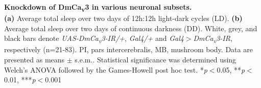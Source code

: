 \label{fig:S5}
\textbf{Knockdown of DmCa\textsubscript{v}3 in various neuronal subsets.}
\\
\textbf {(a)} Average total sleep over two days of 12h:12h light-dark cycles (LD).
\textbf {(b)} Average total sleep over two days of continuous darkness (DD).
White, grey, and black bars denote \emph{UAS-DmCa\textsubscript{v}3-IR/+}, \emph{Gal4/+} and \emph{Gal4$>$DmCa\textsubscript{v}3-IR}, respectively (n=21-83).
PI, pars intercerebralis, MB, mushroom body. 
Data are presented as means $\pm$ s.e.m..
Statistical significance was determined using Welch's ANOVA followed by the Games-Howell post hoc test.
*\emph{p}$<$0.05, **\emph{p}$<$0.01, ***\emph{p}$<$0.001
  
  
  